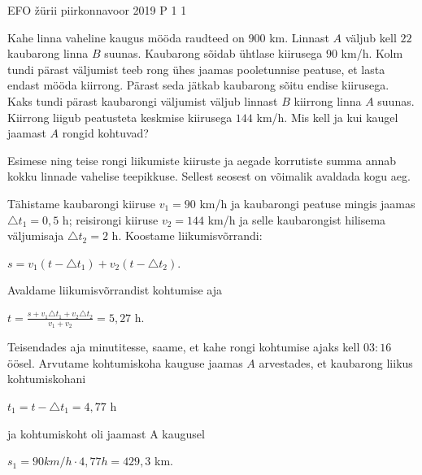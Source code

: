 {EFO žürii} %
{piirkonnavoor} %
{2019} %
{P 1} %
{1} %
{

\ifStatement
Kahe linna vaheline kaugus mööda raudteed on $900$ km. Linnast $A$ väljub kell $22$ kaubarong linna $B$ suunas. Kaubarong sõidab ühtlase kiirusega $90$ km/h. Kolm tundi pärast väljumist teeb rong ühes jaamas pooletunnise peatuse, et lasta endast mööda kiirrong. Pärast seda jätkab kaubarong sõitu endise kiirusega. Kaks tundi pärast kaubarongi väljumist väljub linnast $B$ kiirrong linna $A$ suunas. Kiirrong liigub peatusteta keskmise kiirusega $144$ km/h. Mis kell ja kui kaugel jaamast $A$ rongid kohtuvad?  
\fi

\ifHint
Esimese ning teise rongi liikumiste kiiruste ja aegade korrutiste summa annab kokku linnade vahelise teepikkuse. Sellest seosest on võimalik avaldada kogu aeg. 
\fi

\ifSolution
Tähistame kaubarongi kiiruse $v_1 = 90$ km/h ja kaubarongi peatuse mingis jaamas $\triangle t_1 = 0,5$ h; reisirongi kiiruse $v_2 = 144$ km/h ja selle kaubarongist hilisema väljumisaja $\triangle t_2 = 2$ h.
\newline
Koostame liikumisvõrrandi:
\begin{center}
$s = v_1(t - \triangle t_1) + v_2 (t - \triangle t_2)$.
\end{center}
Avaldame liikumisvõrrandist kohtumise aja
\begin{center}
$t = \frac{s + v_1 \triangle t_1 + v_2 \triangle t_2}{v_1 + v_2} = 5,27$ h.
\end{center}
Teisendades aja minutitesse, saame, et kahe rongi kohtumise ajaks kell $03:16$ öösel. 
\newline
Arvutame kohtumiskoha kauguse jaamas $A$ arvestades, et kaubarong liikus kohtumiskohani
\begin{center}
$t_1 = t - \triangle t_1 = 4,77$ h
\end{center}
ja kohtumiskoht oli jaamast A kaugusel
\begin{center}
$s_1 = 90 km/h \cdot 4,77 h = 429,3$ km.
\end{center}
\fi
}